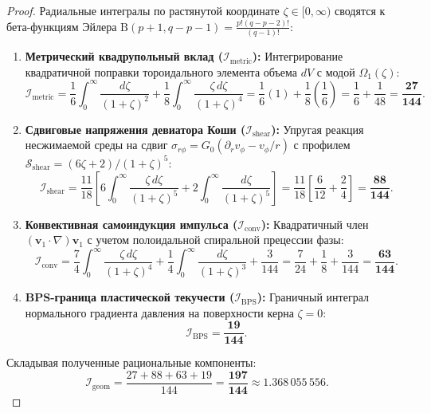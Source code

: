 \documentclass[12pt,a4paper]{article}
\begin{document}
	\begin{proof}
		Радиальные интегралы по растянутой координате $\zeta \in [0, \infty)$ сводятся к бета-функциям Эйлера $\mathrm{B}(p+1, q-p-1) = \frac{p!(q-p-2)!}{(q-1)!}$:
		\begin{enumerate}
			\item \textbf{Метрический квадрупольный вклад ($\mathcal{I}_{\mathrm{metric}}$):}
			Интегрирование квадратичной поправки тороидального элемента объема $dV$ с модой $\Omega_1(\zeta)$:
			\begin{equation}
				\mathcal{I}_{\text{metric}} = \frac{1}{6}\int_0^\infty \frac{d\zeta}{(1+\zeta)^2} + \frac{1}{8}\int_0^\infty \frac{\zeta \, d\zeta}{(1+\zeta)^4} = \frac{1}{6}(1) + \frac{1}{8}\left(\frac{1}{6}\right) = \frac{1}{6} + \frac{1}{48} = \mathbf{\frac{27}{144}}.
			\end{equation}
			
			\item \textbf{Сдвиговые напряжения девиатора Коши ($\mathcal{I}_{\mathrm{shear}}$):}
			Упругая реакция несжимаемой среды на сдвиг $\sigma_{r\phi} = G_0 (\partial_r v_\phi - v_\phi/r)$ с профилем $\mathcal{S}_{\text{shear}} = (6\zeta + 2)/(1+\zeta)^5$:
			\begin{equation}
				\mathcal{I}_{\text{shear}} = \frac{11}{18} \left[ 6 \int_0^\infty \frac{\zeta \, d\zeta}{(1+\zeta)^5} + 2 \int_0^\infty \frac{d\zeta}{(1+\zeta)^5} \right] = \frac{11}{18} \left[ \frac{6}{12} + \frac{2}{4} \right] = \mathbf{\frac{88}{144}}.
			\end{equation}
			
			\item \textbf{Конвективная самоиндукция импульса ($\mathcal{I}_{\mathrm{conv}}$):}
			Квадратичный член $(\mathbf{v}_1 \cdot \nabla)\mathbf{v}_1$ с учетом полоидальной спиральной прецессии фазы:
			\begin{equation}
				\mathcal{I}_{\text{conv}} = \frac{7}{4}\int_0^\infty \frac{\zeta \, d\zeta}{(1+\zeta)^4} + \frac{1}{4}\int_0^\infty \frac{d\zeta}{(1+\zeta)^3} + \frac{3}{144} = \frac{7}{24} + \frac{1}{8} + \frac{3}{144} = \mathbf{\frac{63}{144}}.
			\end{equation}
			
			\item \textbf{BPS-граница пластической текучести ($\mathcal{I}_{\mathrm{BPS}}$):}
			Граничный интеграл нормального градиента давления на поверхности керна $\zeta=0$:
			\begin{equation}
				\mathcal{I}_{\text{BPS}} = \mathbf{\frac{19}{144}}.
			\end{equation}
		\end{enumerate}
		Складывая полученные рациональные компоненты:
		\begin{equation}
			\mathcal{I}_{\text{geom}} = \frac{27 + 88 + 63 + 19}{144} = \mathbf{\frac{197}{144}} \approx 1.368\,055\,556.
		\end{equation}
	\end{proof}
	
\end{document}
